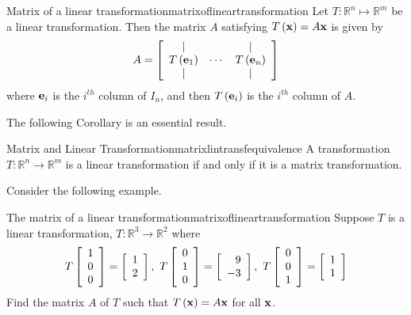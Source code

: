 \begin{theorem}{Matrix of a linear transformation}{matrixoflineartransformation}
Let $T: \mathbb{R}^{n} \mapsto \mathbb{R}^{m}$ be a linear transformation. Then the matrix $A$ satisfying $T\left({\bf x}\right)=A{\bf x}$ is given by
\begin{equation*}
A=
\left[
\begin{array}{ccc}
| &  & | \\
T\left( {\bf e}_{1}\right) & \cdots & T\left( {\bf e}_{n}\right) \\
| &  & |
\end{array}
\right]
\end{equation*}
where ${\bf e}_{i}$ is the $i^{th}$ column of $I_n$, and then $T\left( {\bf e}_{i}
\right)$ is the $i^{th}$ column of $A.$
\end{theorem}

The following Corollary is an essential result.

\begin{corollary}{Matrix and Linear Transformation}{matrixlintransfequivalence}
A transformation $T:\mathbb{R}^n\rightarrow \mathbb{R}^m$ is a linear transformation if and only if it is a matrix transformation. 
\end{corollary}

Consider the following example.

\begin{example}{The matrix of a linear transformation}{matrixoflineartransformation}
Suppose $T$ is a linear transformation, $T:\mathbb{R}^{3}\rightarrow \mathbb{
R}^{2}$ where 
\begin{equation*}
T\left[
\begin{array}{r}
1 \\
0 \\
0
\end{array}
\right] =\left[
\begin{array}{r}
1 \\
2
\end{array}
\right] ,\ T\left[
\begin{array}{r}
0 \\
1 \\
0
\end{array}
\right] =\left[
\begin{array}{r}
9 \\
-3
\end{array}
\right] ,\ T\left[
\begin{array}{r}
0 \\
0 \\
1
\end{array}
\right] =\left[
\begin{array}{r}
1 \\
1
\end{array}
\right]
\end{equation*}
Find the matrix $A$ of $T$ such that $T \left( {\bf x} \right)=A{\bf x}$  for all ${\bf x}$.
\end{example}

